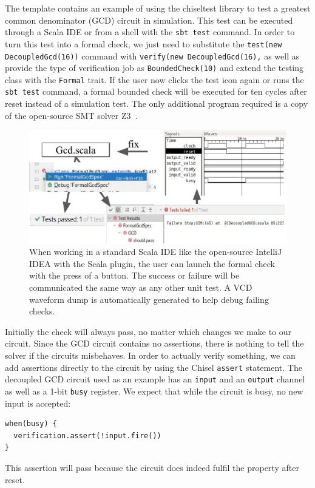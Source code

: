 \documentclass[conference]{IEEEtran}
\newcommand{\code}[1]{{\small{\texttt{#1}}}}
\begin{document}
The template contains an example of using the chiseltest library to test a greatest common denominator (GCD) circuit in simulation.
This test can be executed through a Scala IDE or from a shell with the \code{sbt test} command.
In order to turn this test into a formal check, we just need to substitute the \code{test(new DecoupledGcd(16))}
command with \code{verify(new DecoupledGcd(16),} as well as provide the type of verification job as
\code{BoundedCheck(10)} and extend the testing class with the \code{Formal} trait.
If the user now clicks the test icon again or runs the \code{sbt test} command, a formal bounded check will
be executed for ten cycles after reset instead of a simulation test.
The only additional program required is a copy of the open-source SMT solver Z3~\cite{de2008z3}.



\begin{figure}
\centering
\includegraphics{woset_formal_ide_flow.pdf}
\caption{When working in a standard Scala IDE like the open-source IntelliJ IDEA with the Scala plugin, the user can launch the formal check with the press of a button.
The success or failure will be communicated the same way as any other unit test. A VCD waveform dump is automatically generated to help debug failing checks.}
\label{fig:ide-flow}
\end{figure}

Initially the check will always pass, no matter which changes we make to our circuit.
Since the GCD circuit contains no assertions, there is nothing to tell the solver if the circuits misbehaves.
In order to actually verify something, we can add assertions directly to the circuit by using the
Chisel \code{assert} statement.
The decoupled GCD circuit used as an example has an \code{input} and an \code{output} channel
as well as a 1-bit \code{busy} register.
We expect that while the circuit is busy, no new input is accepted:
\begin{verbatim}
when(busy) {
  verification.assert(!input.fire())
}
\end{verbatim}
This assertion will pass because the circuit does indeed fulfil the property after reset.
\end{document}
